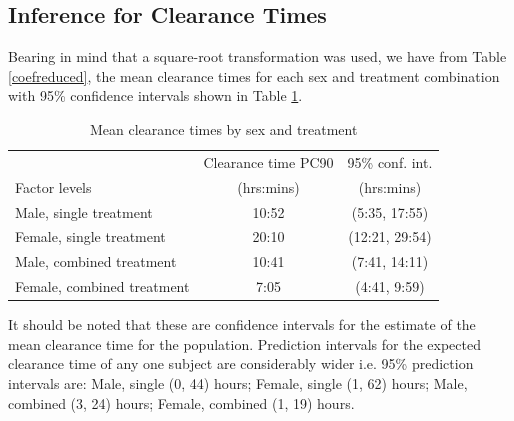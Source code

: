 \subsection{Inference for Clearance Times}

Bearing in mind that a square-root transformation was used, we have from Table \ref{coefreduced}, the mean clearance times for each sex and treatment combination with 95\% confidence intervals shown in Table \ref{inference}.
\begin{table}[h]
\centering
\caption{Mean clearance times by sex and treatment}\label{inference}
\begin{tabular}{|l|c|c|}
\hline
&Clearance time PC90&95\% conf. int.\\
Factor levels&(hrs:mins)&(hrs:mins)\\
\hline
Male, single treatment 		& 10:52 & (5:35, 17:55) \\
Female, single treatment		& 20:10 & (12:21,  29:54) \\
Male, combined treatment	& 10:41 & (7:41, 14:11) \\
Female, combined treatment	& 7:05 & (4:41, 9:59) \\
\hline
\end{tabular}
\end{table}

It should be noted that these are confidence intervals for the estimate of the mean clearance time for the population. Prediction intervals for the expected clearance time of any one subject are considerably wider i.e. 95\% prediction intervals are: Male, single (0, 44) hours; Female, single (1, 62) hours; Male, combined (3, 24) hours; Female, combined (1, 19) hours.

